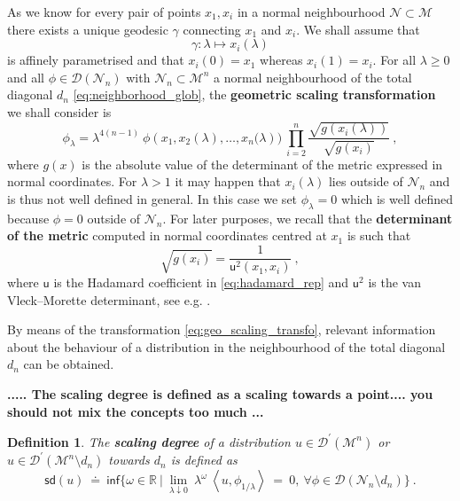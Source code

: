 \documentclass[11pt]{book}
\newcommand{\com}[1]{{\color{red}\bf #1}}
\newcommand{\sd}{\mathsf{sd}}
\renewcommand{\inf}{\mathsf{inf}}
\newcommand{\sm}[1]{\left\langle#1\right\rangle}
\newcommand{\Dcal}{\mathcal{D}}
\newcommand{\Mcal}{\mathcal{M}}
\newcommand{\Ncal}{\mathcal{N}}
\newcommand{\Rbb}{\mathbb{R}}
\newcommand{\usf}{\mathsf{u}}
\theoremstyle{break}
\newtheorem{definition}{Definition}[chapter]
\begin{document}
As we know for every pair of points $x_1,x_i$ in a normal neighbourhood  $\Ncal \subset \Mcal$ there exists a unique geodesic $\gamma$ connecting $x_1$ and $x_i$. We shall assume that
%
\begin{equation*}
\gamma : \lambda \mapsto x_i(\lambda) 
\end{equation*}
%
is affinely parametrised and that $x_i(0) =x_1$ whereas $x_i(1) = x_i$. For all $\lambda \geq 0$ and all $\phi \in \Dcal(\Ncal_n)$ with $\Ncal_n \subset \Mcal^n$ a normal neighbourhood of the total diagonal $d_n$ \eqref{eq:neighborhood_glob}, the \textbf{geometric scaling transformation} we shall consider is
%
\begin{equation}
\phi_\lambda = \lambda^{4(n-1)} \ \phi\left(x_1,x_2(\lambda ),\dots,x_n(\lambda\right)) \ \prod_{i=2}^n \frac{\sqrt{g(x_i(\lambda ))}}{\sqrt{g(x_i)}} \ ,
\label{eq:geo_scaling_transfo}
\end{equation}
%
where $g(x)$ is the absolute value of the determinant of the metric expressed in normal coordinates. For $\lambda > 1$ it may happen that $x_i(\lambda)$ lies outside of $\Ncal_n$ and is thus not well defined in general. In this case we set $\phi_\lambda = 0$ which is well defined because $\phi = 0$ outside of $\Ncal_n$. For later purposes, we recall that the \textbf{determinant of the metric} computed in normal coordinates centred at $x_1$ is such that
%
\begin{equation*}
\sqrt{g(x_i)} = \frac{1}{\usf^2(x_1,x_i)} \ , 
\end{equation*}
%
where $\usf$ is the Hadamard coefficient in \eqref{eq:hadamard_rep} and $\usf^2$ is the van Vleck--Morette determinant, see e.g. \cite{poisson_motion_2011}.


By means of the transformation \eqref{eq:geo_scaling_transfo}, relevant information about the behaviour of a distribution in the neighbourhood of the total diagonal $d_n$ can be obtained. 


\com{..... The scaling degree is defined as a scaling towards a point.... you should not mix the concepts too much   ...}

\begin{definition}\label{def:scaling_degree}
The \textbf{scaling degree} of a distribution $u \in \Dcal^\prime(\Mcal^n)$ or $u \in \Dcal^\prime(\Mcal^n \setminus d_n)$ towards $d_n$ is defined as 
%
\begin{equation*}
\sd(u) \ \doteq \ \inf\bigg\{ \omega \in \Rbb \ \bigg| \ \lim_{\lambda \downarrow 0} \ \lambda^\omega \ \sm{u,\phi_{1/\lambda}} \ = \ 0, \ \forall \phi\in\Dcal(\Ncal_n\setminus d_n) \bigg\} \ .
\end{equation*}
%
\end{definition}
\end{document}
